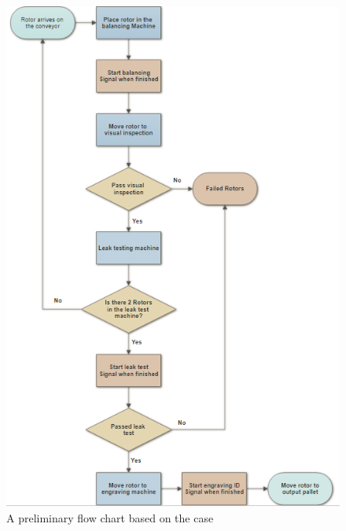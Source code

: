 \begin{figure}[H]
    \centering
    \includegraphics[width=\textwidth]{InitialProblemstatement/Case/UMLcaseny.PNG}
    \caption{A preliminary flow chart based on the case}
    \label{fig:caseflow}
\end{figure}


 
